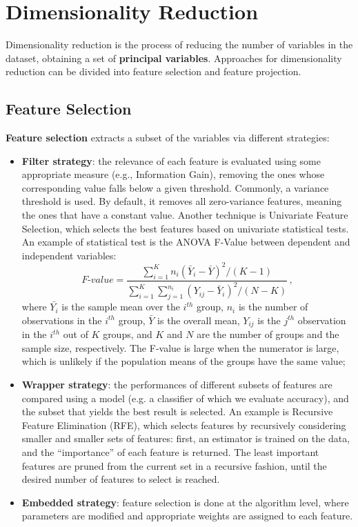 \chapter{Dimensionality Reduction}

Dimensionality reduction is the process of reducing the number of variables in the dataset, obtaining a set of \textbf{principal variables}. Approaches for dimensionality reduction can be divided into feature selection and feature projection.

\section{Feature Selection}

\textbf{Feature selection} extracts a subset of the variables via different strategies: \begin{itemize}
    \item \textbf{Filter strategy}: the relevance of each feature is evaluated using some appropriate measure (e.g., Information Gain), removing the ones whose corresponding value falls below a given threshold. Commonly, a variance threshold is used. By default, it removes all zero-variance features, meaning the ones that have a constant value. Another technique is Univariate Feature Selection, which selects the best features based on univariate statistical tests. An example of statistical test is the ANOVA F-Value between dependent and independent variables:
    \begin{equation*}
        \textit{F-value} = \dfrac{\sum_{i=1}^K n_i(\bar{Y}_i - \bar{Y})^2 / (K-1)}{\sum_{i=1}^K \sum_{j=1}^{n_i} (Y_{ij} - \bar{Y}_i)^2 / (N-K)} \,,
    \end{equation*}
    where $\bar{Y_i}$ is the sample mean over the $i^{th}$ group, $n_i$ is the number of observations in the $i^{th}$ group, $\bar{Y}$ is the overall mean, $Y_{ij}$ is the $j^{th}$ observation in the $i^{th}$ out of $K$ groups, and $K$ and $N$ are the number of groups and the sample size, respectively. The F-value is large when the numerator is large, which is unlikely if the population means of the groups have the same value;

    \item \textbf{Wrapper strategy}: the performances of different subsets of features are compared using a model (e.g. a classifier of which we evaluate accuracy), and the subset that yields the best result is selected. An example is Recursive Feature Elimination (RFE), which selects features by recursively considering smaller and smaller sets of features: first, an estimator is trained on the data, and the ``importance'' of each feature is returned. The least important features are pruned from the current set in a recursive fashion, until the desired number of features to select is reached.

    \item \textbf{Embedded strategy}: feature selection is done at the algorithm level, where parameters are modified and appropriate weights are assigned to each feature.
\end{itemize}

